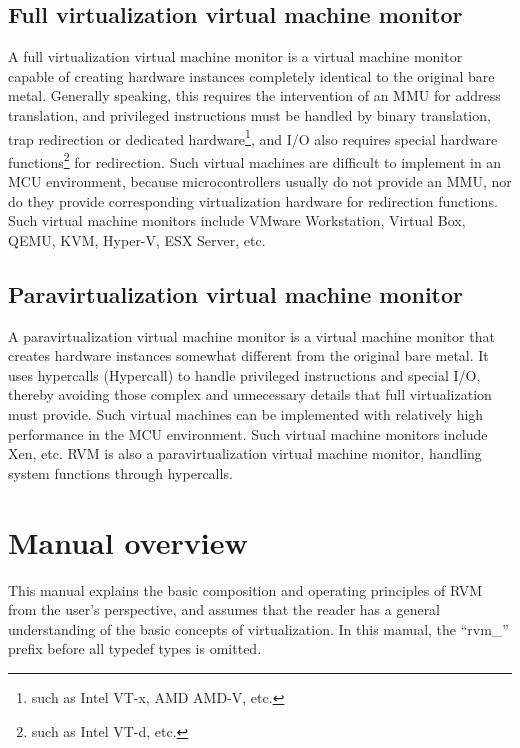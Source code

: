 \subsection{Full virtualization virtual machine monitor}\label{subsec:1-2-4}

A full virtualization virtual machine monitor is a virtual machine monitor capable of creating hardware instances completely identical to the original bare metal. Generally speaking, this requires the intervention of an MMU for address translation, and privileged instructions must be handled by binary translation, trap redirection or dedicated hardware\footnote{such as Intel VT-x, AMD AMD-V, etc.}, and I/O also requires special hardware functions\footnote{such as Intel VT-d, etc.} for redirection. Such virtual machines are difficult to implement in an MCU environment, because microcontrollers usually do not provide an MMU, nor do they provide corresponding virtualization hardware for redirection functions. Such virtual machine monitors include VMware Workstation, Virtual Box, QEMU, KVM, Hyper-V, ESX Server, etc.

\subsection{Paravirtualization virtual machine monitor}\label{subsec:1-2-5}

A paravirtualization virtual machine monitor is a virtual machine monitor that creates hardware instances somewhat different from the original bare metal. It uses hypercalls (Hypercall) to handle privileged instructions and special I/O, thereby avoiding those complex and unnecessary details that full virtualization must provide. Such virtual machines can be implemented with relatively high performance in the MCU environment. Such virtual machine monitors include Xen, etc. RVM is also a paravirtualization virtual machine monitor, handling system functions through hypercalls.

\section{Manual overview}\label{sec:1-3}

This manual explains the basic composition and operating principles of RVM from the user's perspective, and assumes that the reader has a general understanding of the basic concepts of virtualization. In this manual, the ``rvm\_'' prefix before all typedef types is omitted.

